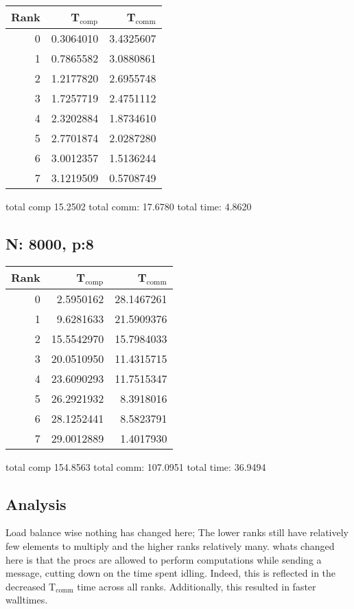 \documentclass[11pt]{article}
\begin{document}
\begin{center}
\begin{tabular}{rrr}
Rank & T\(_{\text{comp}}\) & T\(_{\text{comm}}\)\\
\hline
0 & 0.3064010 & 3.4325607\\
1 & 0.7865582 & 3.0880861\\
2 & 1.2177820 & 2.6955748\\
3 & 1.7257719 & 2.4751112\\
4 & 2.3202884 & 1.8734610\\
5 & 2.7701874 & 2.0287280\\
6 & 3.0012357 & 1.5136244\\
7 & 3.1219509 & 0.5708749\\
\end{tabular}
\end{center}

total comp 15.2502
total comm: 17.6780
total time: 4.8620

\subsection{N: 8000, p:8}
\label{sec:org15a7315}

\begin{center}
\begin{tabular}{rrr}
Rank & T\(_{\text{comp}}\) & T\(_{\text{comm}}\)\\
\hline
0 & 2.5950162 & 28.1467261\\
1 & 9.6281633 & 21.5909376\\
2 & 15.5542970 & 15.7984033\\
3 & 20.0510950 & 11.4315715\\
4 & 23.6090293 & 11.7515347\\
5 & 26.2921932 & 8.3918016\\
6 & 28.1252441 & 8.5823791\\
7 & 29.0012889 & 1.4017930\\
\end{tabular}
\end{center}

total comp 154.8563
total comm: 107.0951
total time: 36.9494

\subsection{Analysis}
\label{sec:org4c16725}

Load balance wise nothing has changed here; The lower ranks still have relatively few elements to multiply and the higher ranks relatively many. whats changed here is that the procs are allowed to perform computations while sending a message, cutting down on the time spent idling. Indeed, this is reflected in the decreased T\(_{\text{comm}}\) time across all ranks. Additionally, this resulted in faster walltimes.
\end{document}
